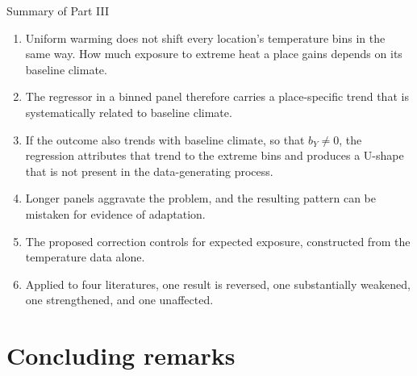 \documentclass[aspectratio=169,10pt]{beamer}
\begin{document}
\begin{frame}{Summary of Part III}
  \begin{enumerate}
    \item Uniform warming does not shift every location's temperature bins in the same
          way. How much exposure to extreme heat a place gains depends on its baseline
          climate.
    \item The regressor in a binned panel therefore carries a place-specific trend
          that is systematically related to baseline climate.
    \item If the outcome also trends with baseline climate, so that $b_Y \neq 0$, the
          regression attributes that trend to the extreme bins and produces a U-shape
          that is not present in the data-generating process.
    \item Longer panels aggravate the problem, and the resulting pattern can be
          mistaken for evidence of adaptation.
    \item The proposed correction controls for expected exposure, constructed from the
          temperature data alone.
    \item Applied to four literatures, one result is reversed, one substantially
          weakened, one strengthened, and one unaffected.
  \end{enumerate}
\end{frame}

\section{Concluding remarks}
\end{document}
